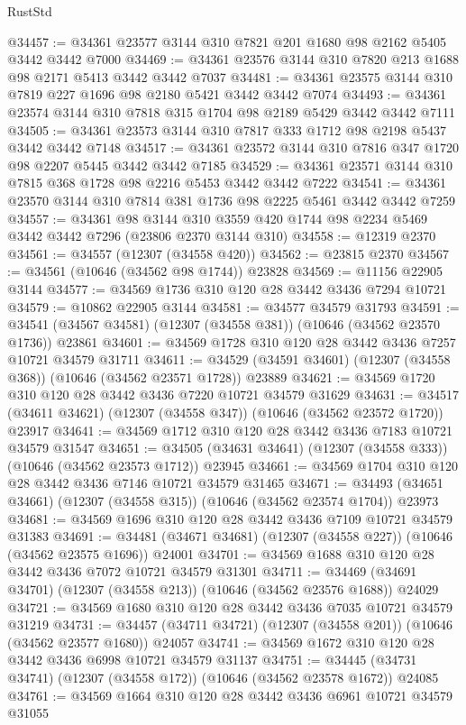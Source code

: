\begin{lexlean}{RustStd}
\begin{coremodule}
@34457 := @34361 @23577 @3144 @310 @7821 @201 @1680 @98 @2162 @5405 @3442 @3442 @7000
@34469 := @34361 @23576 @3144 @310 @7820 @213 @1688 @98 @2171 @5413 @3442 @3442 @7037
@34481 := @34361 @23575 @3144 @310 @7819 @227 @1696 @98 @2180 @5421 @3442 @3442 @7074
@34493 := @34361 @23574 @3144 @310 @7818 @315 @1704 @98 @2189 @5429 @3442 @3442 @7111
@34505 := @34361 @23573 @3144 @310 @7817 @333 @1712 @98 @2198 @5437 @3442 @3442 @7148
@34517 := @34361 @23572 @3144 @310 @7816 @347 @1720 @98 @2207 @5445 @3442 @3442 @7185
@34529 := @34361 @23571 @3144 @310 @7815 @368 @1728 @98 @2216 @5453 @3442 @3442 @7222
@34541 := @34361 @23570 @3144 @310 @7814 @381 @1736 @98 @2225 @5461 @3442 @3442 @7259
@34557 := @34361
    @98
    @3144
    @310
    @3559
    @420
    @1744
    @98
    @2234
    @5469
    @3442
    @3442
    @7296
    (@23806 @2370 @3144 @310)
@34558 := @12319 @2370
@34561 := @34557 (@12307 (@34558 @420))
@34562 := @23815 @2370
@34567 := @34561 (@10646 (@34562 @98 @1744)) @23828
@34569 := @11156 @22905 @3144
@34577 := @34569 @1736 @310 @120 @28 @3442 @3436 @7294 @10721
@34579 := @10862 @22905 @3144
@34581 := @34577 @34579 @31793
@34591 := @34541 (@34567 @34581) (@12307 (@34558 @381)) (@10646 (@34562 @23570 @1736)) @23861
@34601 := @34569 @1728 @310 @120 @28 @3442 @3436 @7257 @10721 @34579 @31711
@34611 := @34529 (@34591 @34601) (@12307 (@34558 @368)) (@10646 (@34562 @23571 @1728)) @23889
@34621 := @34569 @1720 @310 @120 @28 @3442 @3436 @7220 @10721 @34579 @31629
@34631 := @34517 (@34611 @34621) (@12307 (@34558 @347)) (@10646 (@34562 @23572 @1720)) @23917
@34641 := @34569 @1712 @310 @120 @28 @3442 @3436 @7183 @10721 @34579 @31547
@34651 := @34505 (@34631 @34641) (@12307 (@34558 @333)) (@10646 (@34562 @23573 @1712)) @23945
@34661 := @34569 @1704 @310 @120 @28 @3442 @3436 @7146 @10721 @34579 @31465
@34671 := @34493 (@34651 @34661) (@12307 (@34558 @315)) (@10646 (@34562 @23574 @1704)) @23973
@34681 := @34569 @1696 @310 @120 @28 @3442 @3436 @7109 @10721 @34579 @31383
@34691 := @34481 (@34671 @34681) (@12307 (@34558 @227)) (@10646 (@34562 @23575 @1696)) @24001
@34701 := @34569 @1688 @310 @120 @28 @3442 @3436 @7072 @10721 @34579 @31301
@34711 := @34469 (@34691 @34701) (@12307 (@34558 @213)) (@10646 (@34562 @23576 @1688)) @24029
@34721 := @34569 @1680 @310 @120 @28 @3442 @3436 @7035 @10721 @34579 @31219
@34731 := @34457 (@34711 @34721) (@12307 (@34558 @201)) (@10646 (@34562 @23577 @1680)) @24057
@34741 := @34569 @1672 @310 @120 @28 @3442 @3436 @6998 @10721 @34579 @31137
@34751 := @34445 (@34731 @34741) (@12307 (@34558 @172)) (@10646 (@34562 @23578 @1672)) @24085
@34761 := @34569 @1664 @310 @120 @28 @3442 @3436 @6961 @10721 @34579 @31055

\end{coremodule}
\end{lexlean}
